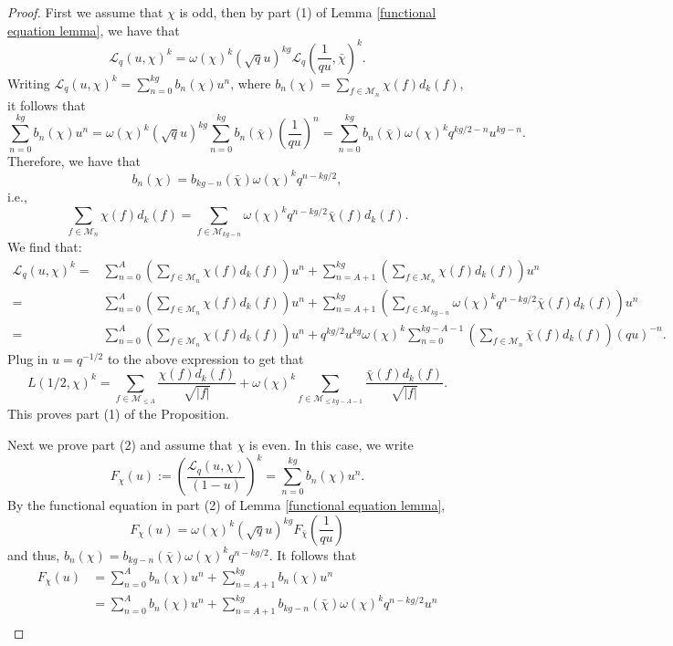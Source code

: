 \documentclass[table]{amsart}
\newcommand{\cM}{\mathcal{M}}
\numberwithin{equation}{section}
\begin{document}
\begin{proof}
First we assume that $\chi$ is odd, then by part (1) of Lemma \ref{functional equation lemma}, we have that
$$
\mathcal{L}_{q}(u, \chi)^k=\omega(\chi)^k(\sqrt{q} u)^{kg} \mathcal{L}_{q}\left(\frac{1}{q u}, \bar{\chi}\right)^k .
$$  Writing
$
\mathcal{L}_q\left(u, \chi\right)^{k}=\sum_{n=0}^{k g} b_n(\chi) u^{n}
$,
where $b_n(\chi)=\sum_{f \in \mathcal{M}_{n}} \chi(f) d_{k}(f)$, it follows that
$$
\sum_{n=0}^{k g} b_n(\chi) u^{n}=\omega(\chi)^k (\sqrt{q} u)^{kg} \sum_{n=0}^{k g} b_n(\bar{\chi}) \left(\frac{1}{qu}\right)^n
=\sum_{n=0}^{kg} b_n(\bar{\chi}) \omega(\chi)^k q^{kg/2-n} u^{kg-n}.$$
Therefore, we have that \[b_n(\chi)=b_{kg-n}(\bar{\chi})\omega(\chi)^k q^{n-kg/2},\] i.e., 
\[\sum_{f \in \mathcal{M}_{n}} \chi(f) d_{k}(f)=\sum_{f \in \mathcal{M}_{kg-n}} \omega(\chi)^k q^{n-kg/2}\bar{\chi}(f) d_{k}(f).\]
We find that:
\[\begin{split}\mathcal{L}_{q}(u, \chi)^k=& \sum_{n=0}^{A} \left(\sum_{f \in \mathcal{M}_{n}} \chi(f)d_k(f)\right) u^n+\sum_{n=A+1}^{kg} \left(\sum_{f \in \mathcal{M}_{n}} \chi(f)d_k(f)\right) u^n\\
= & \sum_{n=0}^{A} \left(\sum_{f \in \mathcal{M}_{n}} \chi(f)d_k(f)\right) u^n+ \sum_{n=A+1}^{kg} \left(\sum_{f \in \mathcal{M}_{kg-n}} \omega(\chi)^k q^{n-kg/2}\bar{\chi}(f) d_{k}(f)\right)u^n \\
= & \sum_{n=0}^{A} \left(\sum_{f \in \mathcal{M}_{n}} \chi(f)d_k(f)\right) u^n+ q^{kg/2}u^{kg}\omega(\chi)^k\sum_{n=0}^{kg-A-1} \left(\sum_{f \in \mathcal{M}_{n}} \bar{\chi}(f)  d_{k}(f)\right)(qu)^{-n}.
\end{split}\]
Plug in $u=q^{-1/2}$ to the above expression to get that 
\[L(1/2, \chi)^k=\sum_{f\in \cM_{\leq A}}\frac{\chi(f)d_k(f)}{\sqrt{|f|}}+ \omega(\chi)^k\sum_{f\in \cM_{\leq kg-A-1}}  \frac{\bar{\chi}(f) d_{k}(f)}{\sqrt{|f|}}.\] This proves part (1) of the Proposition.
\par Next we prove part (2) and assume that $\chi$ is even. In this case, we write
$$
F_\chi(u):=\left(\frac{\mathcal{L}_q\left(u, \chi\right)}{(1-u)}\right)^{k}=\sum_{n=0}^{k g} b_n(\chi) u^{n}.
$$
By the functional equation in part (2) of Lemma \ref{functional equation lemma}, 
\[F_\chi(u)=\omega(\chi)^k (\sqrt{q} u)^{kg}F_{\bar{\chi}}\left(\frac{1}{qu}\right)\]
and thus, $b_n(\chi)=b_{kg-n}(\bar{\chi})\omega(\chi)^k q^{n-kg/2}$.
It follows that 
\begin{align*}
    F_\chi(u)&= \sum_{n=0}^{A} b_n(\chi) u^{n}+\sum_{n=A+1}^{kg} b_n(\chi) u^{n}\\
    &=\sum_{n=0}^{A} b_n(\chi) u^{n}+\sum_{n=A+1}^{kg}b_{kg-n}(\bar{\chi})\omega(\chi)^k q^{n-kg/2}u^n\\

\end{align*}
\end{proof}
\end{document}
